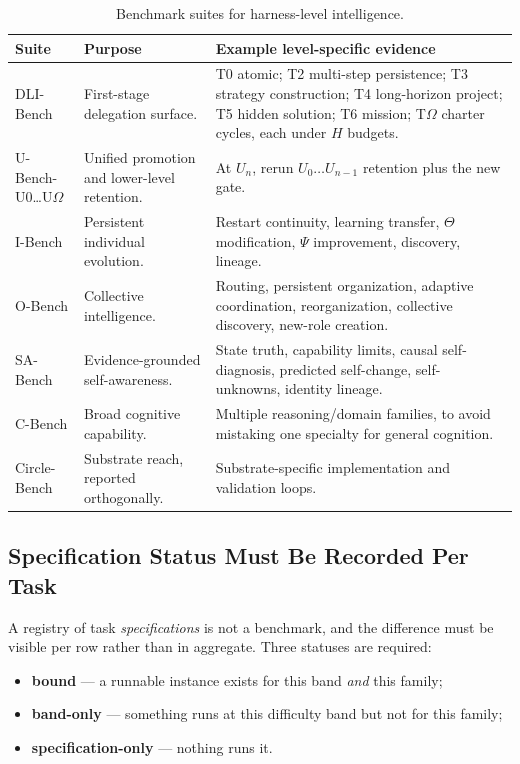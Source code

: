 \documentclass[11pt]{article}
\theoremstyle{definition}
\newcommand{\Om}{\ensuremath{\Omega}}
\begin{document}
\begin{table}[H]
\centering\small
\begin{tabularx}{\textwidth}{@{}lYY@{}}
\toprule
Suite & Purpose & Example level-specific evidence \\
\midrule
DLI-Bench & First-stage delegation surface. & T0 atomic; T2 multi-step persistence; T3 strategy construction; T4 long-horizon project; T5 hidden solution; T6 mission; T\Om{} charter cycles, each under $H$ budgets. \\
U-Bench-U0\ldots U\Om{} & Unified promotion and lower-level retention. & At $U_n$, rerun $U_0 \ldots U_{n-1}$ retention plus the new gate. \\
I-Bench & Persistent individual evolution. & Restart continuity, learning transfer, $\Theta$ modification, $\Psi$ improvement, discovery, lineage. \\
O-Bench & Collective intelligence. & Routing, persistent organization, adaptive coordination, reorganization, collective discovery, new-role creation. \\
SA-Bench & Evidence-grounded self-awareness. & State truth, capability limits, causal self-diagnosis, predicted self-change, self-unknowns, identity lineage. \\
C-Bench & Broad cognitive capability. & Multiple reasoning/domain families, to avoid mistaking one specialty for general cognition. \\
Circle-Bench & Substrate reach, reported orthogonally. & Substrate-specific implementation and validation loops. \\
\bottomrule
\end{tabularx}
\caption{Benchmark suites for harness-level intelligence.}
\label{tab:suites}
\end{table}

\subsection{Specification Status Must Be Recorded Per Task}

A registry of task \emph{specifications} is not a benchmark, and the difference must be visible per row rather than in aggregate. Three statuses are required:

\begin{itemize}
\item \textbf{bound} --- a runnable instance exists for this band \emph{and} this family;
\item \textbf{band-only} --- something runs at this difficulty band but not for this family;
\item \textbf{specification-only} --- nothing runs it.
\end{itemize}
\end{document}

